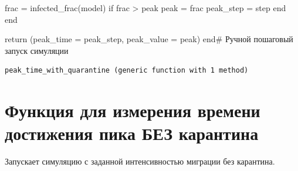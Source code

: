 \documentclass[
  12pt,
  a4paper,
  DIV=11,
  numbers=noendperiod]{scrreprt}
\newenvironment{Shaded}{\begin{snugshade}}{\end{snugshade}}
\newcommand{\CommentTok}[1]{\textcolor[rgb]{0.37,0.37,0.37}{#1}}
\newcommand{\ControlFlowTok}[1]{\textcolor[rgb]{0.00,0.23,0.31}{#1}}
\newcommand{\FunctionTok}[1]{\textcolor[rgb]{0.28,0.35,0.67}{#1}}
\newcommand{\KeywordTok}[1]{\textcolor[rgb]{0.00,0.23,0.31}{#1}}
\newcommand{\NormalTok}[1]{\textcolor[rgb]{0.00,0.23,0.31}{#1}}
\newcommand{\OperatorTok}[1]{\textcolor[rgb]{0.37,0.37,0.37}{#1}}
\begin{document}
\begin{Shaded}
\begin{Highlighting}[]
\NormalTok{        frac }\OperatorTok{=} \FunctionTok{infected\_frac}\NormalTok{(model)}
        \ControlFlowTok{if}\NormalTok{ frac }\OperatorTok{\textgreater{}}\NormalTok{ peak}
\NormalTok{            peak }\OperatorTok{=}\NormalTok{ frac}
\NormalTok{            peak\_step }\OperatorTok{=}\NormalTok{ step}
        \ControlFlowTok{end}
    \ControlFlowTok{end}

    \ControlFlowTok{return}\NormalTok{ (peak\_time }\OperatorTok{=}\NormalTok{ peak\_step, peak\_value }\OperatorTok{=}\NormalTok{ peak)}
\KeywordTok{end}\CommentTok{\# Ручной пошаговый запуск симуляции}
\end{Highlighting}
\end{Shaded}

\begin{verbatim}
peak_time_with_quarantine (generic function with 1 method)
\end{verbatim}

\section{Функция для измерения времени достижения пика БЕЗ
карантина}\label{ux444ux443ux43dux43aux446ux438ux44f-ux434ux43bux44f-ux438ux437ux43cux435ux440ux435ux43dux438ux44f-ux432ux440ux435ux43cux435ux43dux438-ux434ux43eux441ux442ux438ux436ux435ux43dux438ux44f-ux43fux438ux43aux430-ux431ux435ux437-ux43aux430ux440ux430ux43dux442ux438ux43dux430}

Запускает симуляцию с заданной интенсивностью миграции без карантина.
\end{document}
